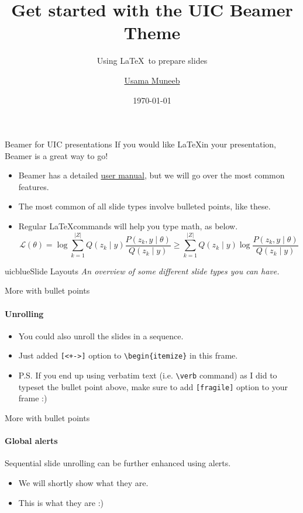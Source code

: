 \documentclass{beamer}
\title{Get started with the UIC Beamer Theme}
\subtitle{Using \LaTeX\ to prepare slides}
\author{\href{mailto:umunee2@uic.edu}{Usama Muneeb}}
\date{\today}
\newcommand{\hrefcol}[2]{\textcolor{uihteal}{\href{#1}{#2}}}
\begin{document}
\maketitle



\begin{frame}{Beamer for UIC presentations}
If you would like \LaTeX in your presentation, Beamer is a great way to go!
\begin{itemize}
\item Beamer has a detailed
\hrefcol{https://www.ctan.org/tex-archive/macros/latex/contrib/beamer/doc/beameruserguide.pdf}{user
 manual}, but we will go over the most common features.
\item The most common of all slide types involve bulleted points, like these.
\item Regular \LaTeX commands will help you type math, as below.
\begin{equation*}
\mathcal{L} (\theta) = \log \sum_{k=1}^{\lvert Z \rvert} Q(z_k \mid y) \frac{P( z_k,  y \mid \theta)}{Q(z_k \mid y)} \geq \sum_{k=1}^{\lvert Z \rvert} Q(z_k \mid y) \log \frac{P( z_k,  y \mid \theta)}{Q(z_k \mid y)}
\end{equation*}
\end{itemize}
\end{frame}


\begin{chapter}{uicblue}{Slide Layouts}
\textit{An overview of some different slide types you can have.}
\end{chapter}


\begin{frame}[fragile]{More with bullet points}
\framesubtitle{Unrolling}
\begin{itemize}[<+->]
\item You could also unroll the slides in a sequence.
\item Just added \verb|[<+->]| option to \verb|\begin{itemize}| in this frame.
\item P.S. If you end up using verbatim text (i.e. \verb|\verb| command) as I did to typeset the bullet point above, make sure to add \verb|[fragile]| option to your frame :)
\end{itemize}
\end{frame}


\begin{frame}[fragile]{More with bullet points}
\framesubtitle{Global alerts}
Sequential slide unrolling can be further enhanced using alerts.
\begin{itemize}[<alert@2>]
\item We will shortly show what they are.
\item<2- | alert@2> This is what they are :)
\end{itemize}
\end{frame}
\end{document}
